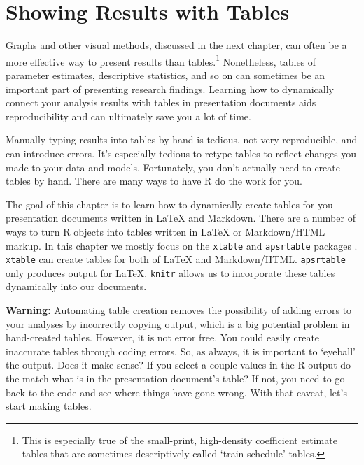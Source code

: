 



\chapter{Showing Results with Tables}\label{TablesChapter}

Graphs and other visual methods, discussed in the next chapter, can often be a more effective way to present results than tables.\footnote{This is especially true of the small-print, high-density coefficient estimate tables that are sometimes descriptively called `train schedule' tables.} Nonetheless, tables of parameter estimates, descriptive statistics, and so on can sometimes be an important part of presenting research findings. Learning how to dynamically connect your analysis results with tables in presentation documents aids reproducibility and can ultimately save you a lot of time.

Manually typing results into tables by hand is tedious, not very reproducible, and can introduce errors. It's especially tedious to retype tables to reflect changes you made to your data and models. Fortunately, you don't actually need to create tables by hand. There are many ways to have R do the work for you. 

The goal of this chapter is to learn how to dynamically create tables for you presentation documents written in LaTeX and Markdown. There are a number of ways to turn R objects into tables written in LaTeX or Markdown/HTML markup. In this chapter we mostly focus on the \texttt{xtable} \cite[]{R-xtable} and \texttt{apsrtable} packages \cite[]{R-apsrtable}. \texttt{xtable} can create tables for both of LaTeX and Markdown/HTML. \texttt{apsrtable} only
produces output for LaTeX. \texttt{knitr} allows us to incorporate these tables dynamically into our documents.

\textbf{Warning:} Automating table creation removes the possibility of adding errors to your analyses by incorrectly copying output, which is a big potential problem in hand-created tables. However, it is not error free. You could easily create inaccurate tables through coding errors. So, as always, it is important to `eyeball' the output. Does it make sense? If you select a couple values in the R output do the match what is in the presentation document's table? If not, you need to go back to the code and see where things have gone wrong. With that caveat, let's start making tables.

